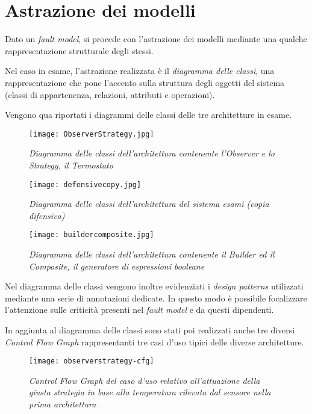 \chapter{Astrazione dei modelli}

Dato un \emph{fault model}, si procede con l'astrazione dei modelli mediante una qualche rappresentazione strutturale degli stessi.

Nel caso in esame, l'astrazione realizzata è il \emph{diagramma delle classi}, una rappresentazione che pone l'accento sulla struttura degli oggetti del sistema (classi di appartenenza, relazioni, attributi e operazioni).

Vengono qua riportati i diagrammi delle classi delle tre architetture in esame.

\begin{figure}[h] 
  \centering
    \texttt{[image: ObserverStrategy.jpg]}
    \caption{{\small \textit{Diagramma delle classi dell'architettura contenente l'Observer e lo Strategy, il Termostato}}}
\end{figure}

\begin{figure}[h] 
  \centering
    \texttt{[image: defensivecopy.jpg]}
    \caption{{\small \textit{Diagramma delle classi dell'architettura del sistema esami (copia difensiva)}}}
\end{figure}

\begin{figure}[h] 
  \centering
    \texttt{[image: buildercomposite.jpg]}
    \caption{{\small \textit{Diagramma delle classi dell'architettura contenente il Builder ed il Composite, il generatore di espressioni booleane}}}
\end{figure}

Nel diagramma delle classi vengono inoltre evidenziati i \emph{design patterns} utilizzati mediante una serie di annotazioni dedicate. In questo modo è possibile focalizzare l'attenzione sulle criticità presenti nel \emph{fault model } e da questi dipendenti.

In aggiunta al diagramma delle classi sono stati poi realizzati anche tre diversi \emph{Control Flow Graph} rappresentanti tre casi d'uso tipici delle diverse architetture. 

\begin{figure}[h] 
  \centering
    \texttt{[image: observerstrategy-cfg]}
    \caption{{\small \textit{Control Flow Graph del caso d'uso relativo all'attuazione della giusta strategia in base alla temperatura rilevata dal sensore nella prima architettura}}}
\end{figure}

